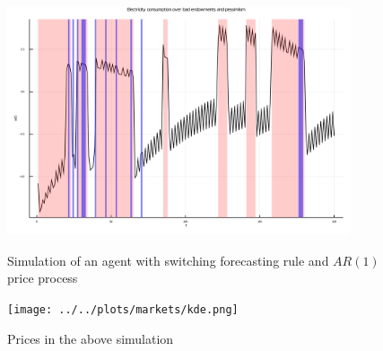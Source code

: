 \documentclass[american]{scrartcl}
\newcommand{\E}{\mathbb{E}}
\begin{document}
\begin{figure}
	\centering
	\includegraphics[width=0.9\textwidth]{../../plots/markets/simul.png}
	\label{fig:sim}
	\caption{Simulation of an agent with switching forecasting rule and $AR(1)$ price process}
\end{figure}

\begin{figure}
	\centering
	\texttt{[image: ../../plots/markets/kde.png]}
	\label{fig:price}
	\caption{Prices in the above simulation}
\end{figure}

\end{document}
